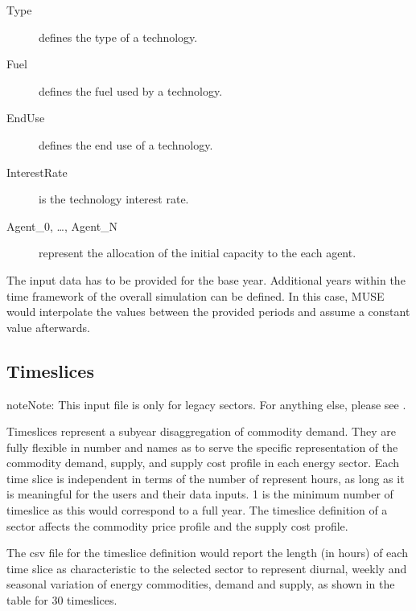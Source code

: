 \documentclass[letterpaper,10pt,english]{sphinxmanual}
\begin{document}
\begin{description}
\item[{Type}] \leavevmode
defines the type of a technology.

\item[{Fuel}] \leavevmode
defines the fuel used by a technology.

\item[{EndUse}] \leavevmode
defines the end use of a technology.

\item[{InterestRate}] \leavevmode
is the technology interest rate.

\item[{Agent\_0, …, Agent\_N}] \leavevmode
represent the allocation of the initial capacity to the each agent.

\end{description}

The input data has to be provided for the base year. Additional years within the time
framework of the overall simulation can be defined. In this case, MUSE would interpolate
the values between the provided periods and assume a constant value afterwards.


\subsection{Time\sphinxhyphen{}slices}
\label{\detokenize{inputs/timeslices:time-slices}}\label{\detokenize{inputs/timeslices:inputs-legacy-timeslices}}\label{\detokenize{inputs/timeslices::doc}}
\begin{sphinxadmonition}{note}{Note:}
This input file is only for legacy sectors. For anything else, please see {\hyperref[\detokenize{inputs/toml:simulation-settings}]{}}.
\end{sphinxadmonition}

Time\sphinxhyphen{}slices represent a sub\sphinxhyphen{}year disaggregation of commodity demand. They are fully
flexible in number and names as to serve the specific representation of the commodity
demand, supply, and supply cost profile in each energy sector.  Each time slice is
independent in terms of the number of represent hours, as long as it is meaningful for the
users and their data inputs. 1 is the minimum number of time\sphinxhyphen{}slice as this would
correspond to a full year.  The time\sphinxhyphen{}slice definition of a sector affects the commodity
price profile and the supply cost profile.

The csv file for the time\sphinxhyphen{}slice definition would report the length (in hours) of each
time slice as characteristic to the selected sector to represent diurnal, weekly and
seasonal variation of energy commodities, demand and supply, as shown in the table for
30 time\sphinxhyphen{}slices.
\end{document}
